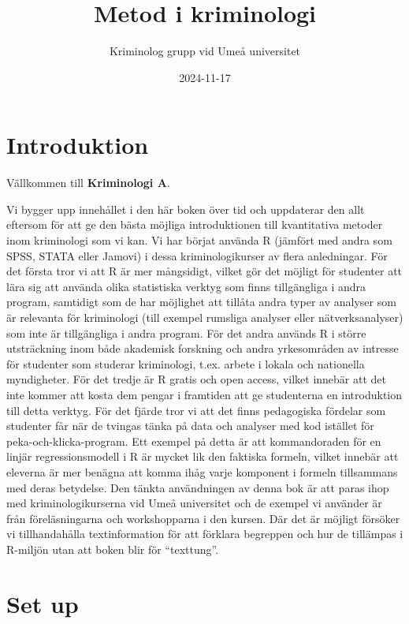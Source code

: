 \documentclass[
]{book}
\title{Metod i kriminologi}
\author{Kriminolog grupp vid Umeå universitet}
\date{2024-11-17}
\begin{document}
\maketitle

{
\setcounter{tocdepth}{1}
\tableofcontents
}
\chapter{Introduktion}\label{introduktion}

Vällkommen till \textbf{Kriminologi A}.

Vi bygger upp innehållet i den här boken över tid och uppdaterar den allt eftersom för att ge den bästa möjliga introduktionen till kvantitativa metoder inom kriminologi som vi kan. Vi har börjat använda R (jämfört med andra som SPSS, STATA eller Jamovi) i dessa kriminologikurser av flera anledningar. För det första tror vi att R är mer mångsidigt, vilket gör det möjligt för studenter att lära sig att använda olika statistiska verktyg som finns tillgängliga i andra program, samtidigt som de har möjlighet att tillåta andra typer av analyser som är relevanta för kriminologi (till exempel rumsliga analyser eller nätverksanalyser) som inte är tillgängliga i andra program. För det andra används R i större utsträckning inom både akademisk forskning och andra yrkesområden av intresse för studenter som studerar kriminologi, t.ex. arbete i lokala och nationella myndigheter. För det tredje är R gratis och open access, vilket innebär att det inte kommer att kosta dem pengar i framtiden att ge studenterna en introduktion till detta verktyg. För det fjärde tror vi att det finns pedagogiska fördelar som studenter får när de tvingas tänka på data och analyser med kod istället för peka-och-klicka-program. Ett exempel på detta är att kommandoraden för en linjär regressionsmodell i R är mycket lik den faktiska formeln, vilket innebär att eleverna är mer benägna att komma ihåg varje komponent i formeln tillsammans med deras betydelse. Den tänkta användningen av denna bok är att paras ihop med kriminologikurserna vid Umeå universitet och de exempel vi använder är från föreläsningarna och workshopparna i den kursen. Där det är möjligt försöker vi tillhandahålla textinformation för att förklara begreppen och hur de tillämpas i R-miljön utan att boken blir för ``texttung''.

\chapter{Set up}\label{set-up}
\end{document}
